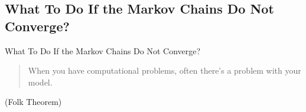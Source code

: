 \subsection{What To Do If the Markov Chains Do Not Converge?}

\begin{frame}{What To Do If the Markov Chains Do Not Converge?}
    \vfill
    \begin{quotation}
        When you have computational problems,
        often there’s a problem with your model.
    \end{quotation}
    \vfill \vfill
    \textcite{gelmanFolkTheoremStatistical2008} (Folk Theorem)
\end{frame}


